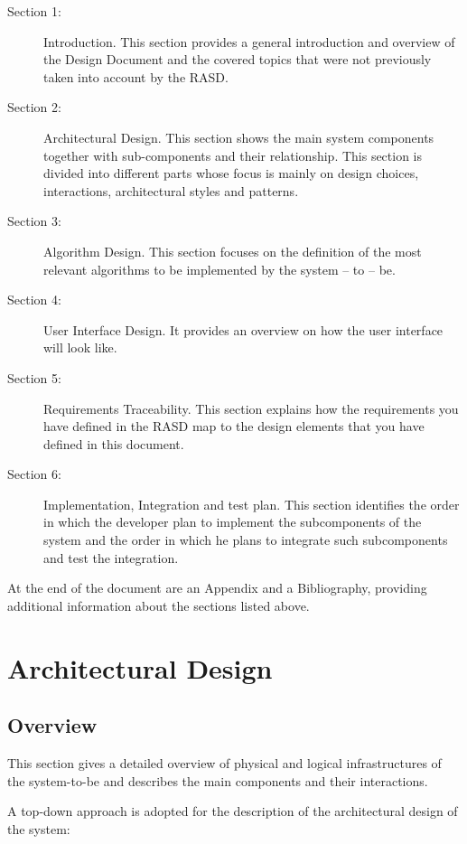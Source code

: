 \documentclass{article}
\begin{document}
	\begin{description}
	\item [Section 1:] Introduction. This section provides a general introduction and overview of the Design Document and the covered topics that were not previously taken into account by the RASD.
	\item [Section 2:] Architectural Design. This section shows the main system components together with sub-components and their relationship. This section is divided into different parts whose focus is mainly on design choices, interactions, architectural styles and patterns.
	\item [Section 3:] Algorithm Design. This section focuses on the definition of the most relevant algorithms to be implemented by the system – to – be.
	\item [Section 4:] User Interface Design. It provides an overview on how the user interface will look like.
	\item [Section 5:] Requirements Traceability. This section explains how the requirements you have defined in the RASD map to the design elements that you have defined in this document.
	\item [Section 6:] Implementation, Integration and test plan. This section identifies the order in which the developer plan to implement the subcomponents of the system and the order in which he plans to integrate such subcomponents and test the integration.
	\end{description}

	\bigskip
	At the end of the document are an Appendix and a Bibliography, providing additional information about the sections listed above.

	\section{Architectural Design}


	\subsection{Overview}

	This section gives a detailed overview of physical and logical infrastructures of the system-to-be and describes the main components and their interactions.

	A top-down approach is adopted for the description of the architectural design of the system:
\end{document}
